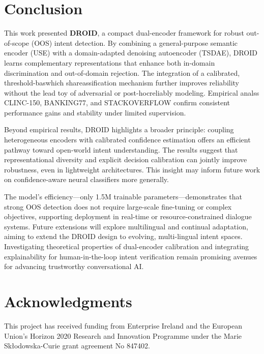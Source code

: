 \documentclass[journal,letterpaper]{IEEEtran}
\begin{document}
\section{Conclusion}
\label{sec:conclusion}

This work presented \textbf{DROID}, a compact dual-encoder framework for robust out-of-scope (OOS) intent detection. By combining a general-purpose semantic encoder (USE) with a domain-adapted denoising autoencoder (TSDAE), DROID learns complementary representations that enhance both in-domain discrimination and out-of-domain rejection. The integration of a calibrated, threshold-baswhich shareassification mechanism further improves reliability without the lead toy of adversarial or post-hocreliably  modeling. Empirical analss \textsc{CLINC-150}, \textsc{BANKING77}, and \textsc{STACKOVERFLOW} confirm consistent performance gains and stability under limited supervision.

Beyond empirical results, DROID highlights a broader principle: coupling heterogeneous encoders with calibrated confidence estimation offers an efficient pathway toward open-world intent understanding. The results suggest that representational diversity and explicit decision calibration can jointly improve robustness, even in lightweight architectures. This insight may inform future work on confidence-aware neural classifiers more generally.

The model’s efficiency—only 1.5M trainable parameters—demonstrates that strong OOS detection does not require large-scale fine-tuning or complex objectives, supporting deployment in real-time or resource-constrained dialogue systems. Future extensions will explore multilingual and continual adaptation, aiming to extend the DROID design to evolving, multi-lingual intent spaces. Investigating theoretical properties of dual-encoder calibration and integrating explainability for human-in-the-loop intent verification remain promising avenues for advancing trustworthy conversational AI.




\section{Acknowledgments}
This project has received funding from Enterprise Ireland and the European Union's Horizon 2020 Research and Innovation Programme under the Marie Skłodowska-Curie grant agreement No 847402.



\end{document}
